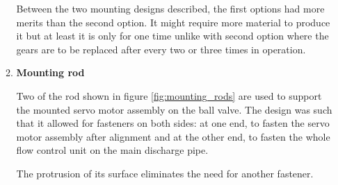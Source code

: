 \begin{enumerate}
\begin{enumerate}
\begin{enumerate}
\begin{itemize}
          \end{itemize}
     \end{enumerate}
     \par
     Between the two mounting designs described, the first options had more merits than the second option. It might require more material to produce it but at least it is only for one time unlike with second option where the gears are to be replaced after every two or three times in operation.
     \par 
     \item \textbf{Mounting rod}
     \par
     Two of the rod shown in figure \ref{fig:mounting_rods} are used to support the mounted servo motor assembly on the ball valve. The design was such that it allowed for fasteners on both sides: at one end, to fasten the servo motor assembly after alignment and at the other end, to fasten the whole flow control unit on the main discharge pipe.
     \par
     The protrusion of its surface eliminates the need for another fastener. 
      \begin{figure}[H]
          \centering

\end{figure}
\end{enumerate}
\end{enumerate}
